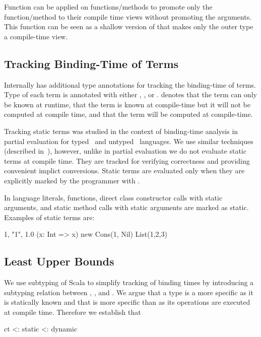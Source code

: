 Function  can be applied on functions/methods to promote only the function/method
 to their compile time views without promoting the arguments. This function can be
 seen as a shallow version of  that makes only the outer type a compile-time view.

\subsection{Tracking Binding-Time of Terms}
\label{sct:static}


 Internally \tool has additional type annotations for tracking the binding-time of terms.
  Type of each term is annotated with either , , or .  denotes
  that the term can only be known at runtime,  that the term is known
  at compile-time but it will not be computed at compile time, and  that
  the term will be computed at compile-time.

 Tracking static terms was studied in the context of binding-time analysis
  in partial evaluation for typed~\cite{nielson_1988_automatic} and
  untyped~\cite{gomard1991partial} languages. We use similar techniques
  (described in~), however, unlike in partial evaluation we
  do not evaluate static terms at compile time. They are tracked for verifying
  correctness and providing convenient implict conversions. Static terms are evaluated only
  when they are explicitly marked by the programmer with .

In \tool language literals, functions, direct class constructor calls with static arguments, and static method
 calls with static arguments are marked as static. Examples of static terms are:\begin{lstparagraph}
1, "1", 1.0
(x: Int => x)
new Cons(1, Nil)
List(1,2,3)
\end{lstparagraph}

\subsection{Least Upper Bounds}
\label{sct:lub}

 We use subtyping of Scala to simplify tracking of binding times by introducing a
 subtyping relation between , , and . We argue that
 a  type is a more specific  as it is statically known
 and that  is more specific than  as its operations are executed
 at compile time. Therefore we establish that\begin{lstparagraph}
                 ct <: static <: dynamic
\end{lstparagraph}

